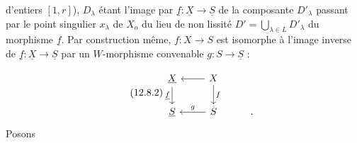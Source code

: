 
d'entiers $[1,r]$), $D_\lambda$ étant l'image par $\underline{f} : \underline{X} \longrightarrow \underline{S}$ de la composante $D'_\lambda$ passant par le point singulier $x_\lambda$ de $X_o$ du lieu de non lissité $D' = \bigcup_{\lambda \in L} D'_\lambda$ du morphisme $\underline{f}$. Par construction même, $f : X \longrightarrow S$ est isomorphe à l'image inverse de $\underline{f} : \underline{X} \longrightarrow \underline{S}$ par un $W$-morphisme convenable $g : S \longrightarrow \underline{S}$ :

\begin{equation}\tag{12.8.2}
\begin{tikzcd}
\underline{X} \arrow[d, "\underline{f}"'] & X \arrow[l] \arrow[d, "f"] \\
\underline{S} & S \arrow[l, "g"'] & .
\end{tikzcd}
\end{equation}
Posons

